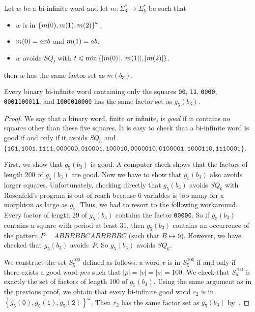 \documentclass[10pt,a4paper]{amsart}
\def\acc#1{\left\{ #1 \right\}}
\renewcommand{\le}{\leqslant}
\begin{document}
\begin{lemma}\label{lem:b3}
Let $w$ be a bi-infinite word and let $m:\Sigma^*_3\rightarrow\Sigma^*_k$ be such that 
\begin{itemize}
 \item $w$ is in $\acc{m(\textnormal{\texttt{0}}),m(\textnormal{\texttt{1}}),m(\textnormal{\texttt{2}})}^\omega$,
 \item $m(\textnormal{\texttt{0}})=axb$ and $m(\textnormal{\texttt{1}})=ab$,
 \item $w$ avoids $SQ_t$ with $t\le\min\acc{|m(\textnormal{\texttt{0}})|,|m(\textnormal{\texttt{1}})|,|m(\textnormal{\texttt{2}})|}$.
\end{itemize}
then $w$ has the same factor set as $m(b_3)$.
\end{lemma}

\begin{theorem}
Every binary bi-infinite word containing only the squares \textnormal{\texttt{00}}, \textnormal{\texttt{11}}, \textnormal{\texttt{0000}}, \textnormal{\texttt{0001100011}}, and \textnormal{\texttt{1000010000}}
has the same factor set as $g_5(b_3)$.
\end{theorem}

\begin{proof}
We say that a binary word, finite or infinite, is \emph{good} if it contains
no squares other than these five squares.
It is easy to check that a bi-infinite word is good if and only if it avoids $SQ_6$ and\\
$\{\texttt{101},\texttt{1001},\texttt{1111},\texttt{000000},\texttt{010001},
\texttt{100010},\texttt{0000010},\texttt{0100001},\texttt{1000110},\texttt{1110001}\}$.

First, we show that $g_5(b_3)$ is good.
A computer check shows that the factors of length 200 of $g_5(b_3)$ are good.
Now we have to show that $g_5(b_3)$ also avoids larger squares.
Unfortunately, checking directly that $g_5(b_3)$ avoids $SQ_6$ with Rosenfeld's program
is out of reach because 6 variables is too many for a morphism as large as $g_5$.
Thus, we had to resort to the following workaround.
Every factor of length 29 of $g_5(b_3)$ contains the factor \texttt{00000}.
So if $g_5(b_3)$ contains a square with period at least 31, then $g_5(b_3)$ contains an occurrence
of the pattern $P=ABBBBBCABBBBBC$ (such that $B\mapsto\texttt{0}$).
However, we have checked that $g_5(b_3)$ avoids~$P$. So $g_5(b_3)$ avoids $SQ_6$.

We construct the set $S_5^{100}$ defined as follows:
a word $v$ is in $S_5^{100}$ if and only if there exists a good word $pvs$ such that $|p|=|v|=|s|=100$.
We check that $S_5^{100}$ is exactly the set of factors of length 100 of $g_5(b_3)$.
Using the same argument as in the previous proof, we obtain that every bi-infinite good word $r_2$
is in $\acc{g_5(\texttt{0}),g_5(\texttt{1}),g_5(\texttt{2})}^\omega$.
Then $r_2$ has the same factor set as $g_5(b_3)$ by~.
\end{proof}
\end{document}
